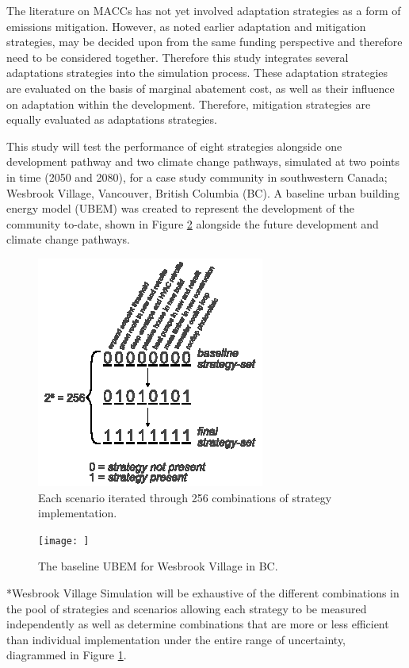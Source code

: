 \documentclass[twocolumn, a4paper,10pt]{article}
\makeatletter
\renewcommand\subsection{\@startsection{subsection}{1}{\z@}{\z@}{\z@}{\normalfont\normalsize\bfseries}}
\renewcommand\subsection{\@startsection{subsection}{1}{\z@}{\z@}{0.1pt}{\normalfont\normalsize\bfseries}}
\makeatother
\begin{document}
The literature on MACCs has not yet involved adaptation strategies as a form of emissions mitigation. However, as noted earlier adaptation and mitigation strategies, may be decided upon from the same funding perspective and therefore need to be considered together. Therefore this study integrates several adaptations strategies into the simulation process. These adaptation strategies are evaluated on the basis of marginal abatement cost, as well as their influence on adaptation within the development. Therefore, mitigation strategies are equally evaluated as adaptations strategies. 

This study will test the performance of eight strategies alongside one development pathway and two climate change pathways, simulated at two points in time (2050 and 2080), for a case study community in southwestern Canada; Wesbrook Village, Vancouver, British Columbia (BC). A baseline urban building energy model (UBEM) was created to represent the development of the community to-date, shown in Figure \ref{fig:wesbrook_base} alongside the future development and climate change pathways.

\begin{figure}
    \centering
    \includegraphics[scale=2.3]{figures/sample_sequence.eps}
    \caption{Each scenario iterated through 256 combinations of strategy implementation.}
    \label{fig:sample_sequence}
\end{figure}

\begin{figure}
    \centering
    \texttt{[image: ]}
    \caption{The baseline UBEM for Wesbrook Village in BC.}
    \label{fig:wesbrook_base}
\end{figure}

\subsection*{Wesbrook Village} 
Simulation will be exhaustive of the different combinations in the pool of strategies and scenarios allowing each strategy to be measured independently as well as determine combinations that are more or less efficient than individual implementation under the entire range of uncertainty, diagrammed in Figure \ref{fig:sample_sequence}.
\end{document}

